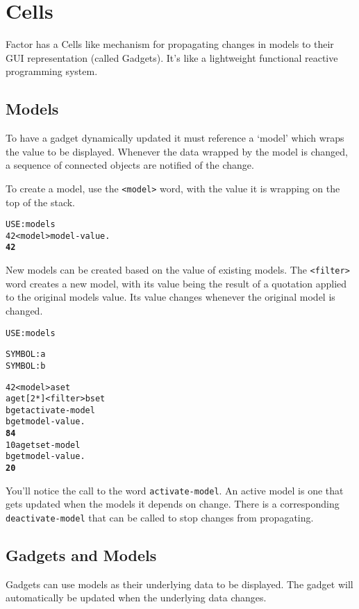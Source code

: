 \chapter{Cells}\label{cells}

Factor has a Cells like mechanism for propagating changes in models to
their GUI representation (called Gadgets). It's like a lightweight
functional reactive programming system. 

\section{Models}
To have a gadget dynamically updated it must reference a `model' which
wraps the value to be displayed. Whenever the data wrapped by the
model is changed, a sequence of connected objects are notified of the
change.  

To create a model, use the \verb|<model>| word, with the value it is wrapping
on the top of the stack.

\begin{alltt}
USE: models
42 <model> model-value .
  \textbf{42}
\end{alltt}

New models can be created based on the value of existing models. The \verb|<filter>| word creates a new model, with its value being the result of a quotation applied to the original models value. Its value changes whenever the original model is changed.
\begin{alltt}
USE: models

SYMBOL: a
SYMBOL: b

42 <model> a set
a get [ 2 * ] <filter> b set
b get activate-model
b get model-value .
  \textbf{84}
10 a get set-model
b get model-value .
  \textbf{20}
\end{alltt}
You'll notice the call to the word \verb|activate-model|. An active model is one that gets updated when the models it depends on change. There is a corresponding \verb|deactivate-model| that can be called to stop changes from propagating.



\section{Gadgets and Models}
Gadgets can use models as their underlying data to be displayed. The gadget will automatically be updated when the underlying data changes. 

